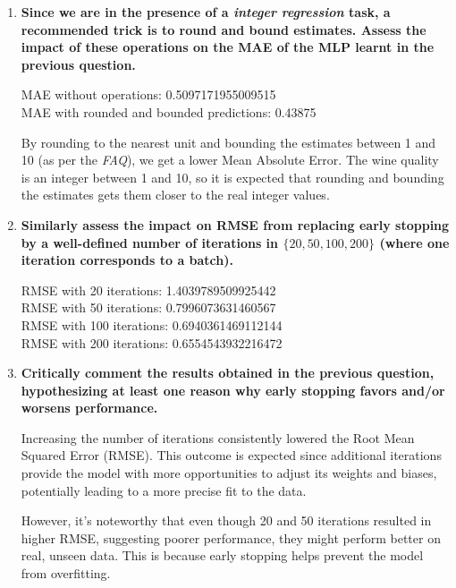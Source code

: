 \documentclass[12pt]{article}
\begin{document}
\begin{enumerate}[leftmargin=\labelsep]
    \item \textbf{Since we are in the presence of a \textit{integer regression} task, a recommended trick is to
          round and bound estimates. Assess the impact of these operations on the MAE of the MLP learnt in the previous question.}

          \vskip 0.3cm
          

          MAE without operations: 0.5097171955009515 \\
          MAE with rounded and bounded predictions: 0.43875

          \vskip 0.2cm
          By rounding to the nearest unit and bounding the estimates between 1 and 10 (as per the \textit{FAQ}), we get a lower Mean Absolute Error.
          The wine quality is an integer between 1 and 10, so it is expected that rounding and bounding the estimates gets them closer to the real integer values.

    \item \textbf{Similarly assess the impact on RMSE from replacing early stopping by a well-defined
          number of iterations in $\{20,50,100,200\}$ (where one iteration corresponds to a batch).}

          \vskip 0.3cm
          

          RMSE with 20 iterations: 1.4039789509925442  \\
          RMSE with 50 iterations: 0.7996073631460567  \\
          RMSE with 100 iterations: 0.6940361469112144 \\
          RMSE with 200 iterations: 0.6554543932216472

    \item \textbf{Critically comment the results obtained in the previous question, hypothesizing at least
          one reason why early stopping favors and/or worsens performance.}

          \vskip 0.3cm
          Increasing the number of iterations consistently lowered the Root Mean Squared Error (RMSE).
          This outcome is expected since additional iterations provide the model with more opportunities to adjust its weights and biases, potentially
           leading to a more precise fit to the data.

          However, it's noteworthy that even though 20 and 50 iterations resulted in higher RMSE, suggesting poorer performance, they might perform better on real, unseen data.
          This is because early stopping helps prevent the model from overfitting.


\end{enumerate}
\end{document}
